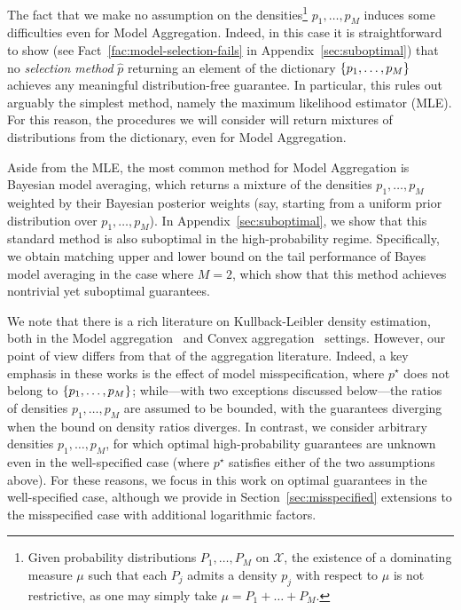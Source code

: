 \documentclass[11pt]{article}
\newcommand{\wh}{\widehat}
\newcommand{\M}{M}
\newcommand{\X}{\mathcal{X}}
\theoremstyle{definition}
\theoremstyle{remark}
\DeclarePairedDelimiter{\set}{\{}{\}}
\begin{document}
The fact that we make no assumption on the densities\footnote{Given probability distributions $P_1, \dots, P_\M$ on $\X$, the existence of a dominating measure $\mu$ such that each $P_j$ admits a density $p_j$ with respect to $\mu$ is not restrictive, as one may simply take $\mu = P_1 + \dots + P_\M$.} $p_1, \dots, p_\M$ induces some difficulties even for Model Aggregation.
Indeed, in this case it is straightforward to show (see Fact~\ref{fac:model-selection-fails} in Appendix~\ref{sec:suboptimal}) that no \emph{selection method} $\wh p$ returning an element of the dictionary $\set{p_1, \dots, p_\M}$ achieves any meaningful distribution-free guarantee.
In particular, this rules out arguably the simplest method, namely the maximum likelihood estimator (MLE).
For this reason, the procedures we will consider will return mixtures of distributions from the dictionary, even for Model Aggregation.

Aside from the MLE, the most common method for Model Aggregation is Bayesian model averaging, which returns a mixture of the densities $p_1, \dots, p_\M$ weighted by their Bayesian posterior weights (say, starting from a uniform prior distribution over $p_1, \dots, p_\M$).
In Appendix~\ref{sec:suboptimal}, we show that this standard method is also suboptimal in the high-probability regime.
Specifically, we obtain matching upper and lower bound on the tail performance of Bayes model averaging in the case where $M=2$, which show that this method achieves nontrivial yet suboptimal guarantees.

We note that there is a rich literature on Kullback-Leibler density estimation, both in the Model aggregation~\cite{barron1987bayes,yang1999information,yang2000mixing,catoni1997mixture,juditsky2008learning,audibert2007progressive,audibert2009fastrates,Rigollet2012KLAggregation,ButuceaDelmasDutfoyFischer2017Optimal,baraud2021tests,vanderhoeven2023high} and Convex aggregation~\cite{li1999mixture,li1999estimation,rakhlin2005risk,dalalyan2018optimal} settings.
However, our point of view differs from that of the aggregation literature.
Indeed, a key emphasis in these works is the effect of model misspecification, where $p^\star$ does not belong to $\set{p_1, \dots, p_\M}$; while---with two exceptions discussed below---the ratios of densities $p_1, \dots, p_\M$ are assumed to be bounded, with the guarantees diverging when the bound on density ratios diverges.
In contrast, we consider arbitrary densities $p_1, \dots, p_\M$, for which optimal high-probability guarantees are unknown even in the well-specified case (where $p^\star$ satisfies either of the two assumptions above).
For these reasons, we focus in this work on optimal guarantees in the well-specified case, although we provide in Section~\ref{sec:misspecified} extensions to the misspecified case with additional logarithmic factors.
\end{document}
